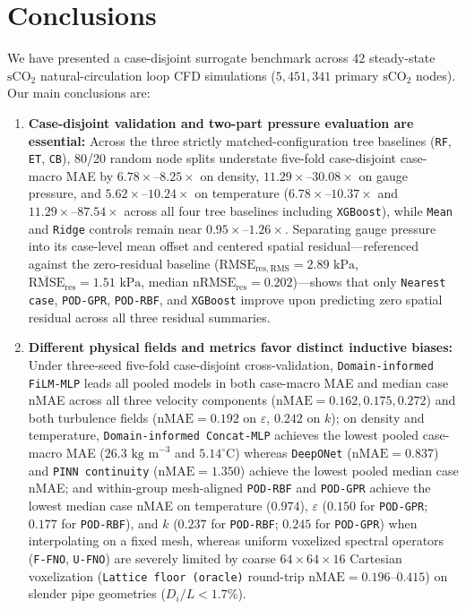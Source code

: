 \documentclass[11pt]{article}
\begin{document}
\section{Conclusions}
We have presented a case-disjoint surrogate benchmark across 42 steady-state $\mathrm{sCO}_2$ natural-circulation loop CFD simulations ($5,451,341$ primary $\mathrm{sCO}_2$ nodes). Our main conclusions are:
\begin{enumerate}
  \item \textbf{Case-disjoint validation and two-part pressure evaluation are essential:} Across the three strictly matched-configuration tree baselines (\texttt{RF}, \texttt{ET}, \texttt{CB}), 80/20 random node splits understate five-fold case-disjoint case-macro MAE by $6.78\times\text{--}8.25\times$ on density, $11.29\times\text{--}30.08\times$ on gauge pressure, and $5.62\times\text{--}10.24\times$ on temperature ($6.78\times\text{--}10.37\times$ and $11.29\times\text{--}87.54\times$ across all four tree baselines including \texttt{XGBoost}), while \texttt{Mean} and \texttt{Ridge} controls remain near $0.95\times\text{--}1.26\times$. Separating gauge pressure into its case-level mean offset and centered spatial residual---referenced against the zero-residual baseline ($\mathrm{RMSE}_{\mathrm{res,RMS}} = 2.89\text{ kPa}$, $\overline{\mathrm{RMSE}}_{\mathrm{res}} = 1.51\text{ kPa}$, median $\mathrm{nRMSE}_{\mathrm{res}} = 0.202$)---shows that only \texttt{Nearest case}, \texttt{POD-GPR}, \texttt{POD-RBF}, and \texttt{XGBoost} improve upon predicting zero spatial residual across all three residual summaries.
  \item \textbf{Different physical fields and metrics favor distinct inductive biases:} Under three-seed five-fold case-disjoint cross-validation, \texttt{Domain-informed FiLM-MLP} leads all pooled models in both case-macro MAE and median case nMAE across all three velocity components ($\mathrm{nMAE} = 0.162, 0.175, 0.272$) and both turbulence fields ($\mathrm{nMAE} = 0.192$ on $\varepsilon$, $0.242$ on $k$); on density and temperature, \texttt{Domain-informed Concat-MLP} achieves the lowest pooled case-macro MAE ($26.3\text{ kg m}^{-3}$ and $5.14^\circ\text{C}$) whereas \texttt{DeepONet} ($\mathrm{nMAE} = 0.837$) and \texttt{PINN continuity} ($\mathrm{nMAE} = 1.350$) achieve the lowest pooled median case nMAE; and within-group mesh-aligned \texttt{POD-RBF} and \texttt{POD-GPR} achieve the lowest median case nMAE on temperature ($0.974$), $\varepsilon$ ($0.150$ for \texttt{POD-GPR}; $0.177$ for \texttt{POD-RBF}), and $k$ ($0.237$ for \texttt{POD-RBF}; $0.245$ for \texttt{POD-GPR}) when interpolating on a fixed mesh, whereas uniform voxelized spectral operators (\texttt{F-FNO}, \texttt{U-FNO}) are severely limited by coarse $64\times 64\times 16$ Cartesian voxelization (\texttt{Lattice floor (oracle)} round-trip $\mathrm{nMAE} = 0.196\text{--}0.415$) on slender pipe geometries ($D_i/L < 1.7\%$).

\end{enumerate}
\end{document}
